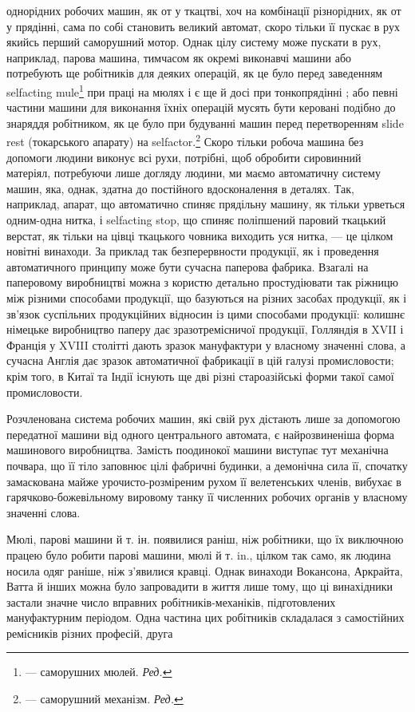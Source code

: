 \parcont{}  %
однорідних робочих машин, як от у ткацтві, хоч на комбінації
різнорідних, як от у прядінні, сама по собі становить великий
автомат, скоро тільки її пускає в рух якийсь перший саморушний
мотор. Однак цілу систему може пускати в рух, наприклад,
парова машина, тимчасом як окремі виконавчі машини або потребують
ще робітників для деяких операцій, як це було перед заведенням
selfacting mule\footnote*{
— саморушних мюлей. \emph{Ред.}
} при праці на мюлях і є ще й досі при тонкопрядінні
; або певні частини машини для виконання їхніх операцій
мусять бути керовані подібно до знаряддя робітником, як це було
при будуванні машин перед перетворенням slide rest (токарського
апарату) на selfactor.\footnote*{
— саморушний механізм. \emph{Ред.}
} Скоро тільки робоча машина без допомоги
людини виконує всі рухи, потрібні, щоб обробити сировинний
матеріял, потребуючи лише догляду людини, ми маємо автоматичну
систему машин, яка, однак, здатна до постійного вдосконалення
в деталях. Так, наприклад, апарат, що автоматично
спиняє прядільну машину, як тільки урветься одним-одна нитка,
і selfacting stop, що спиняє поліпшений паровий ткацький верстат,
як тільки на цівці ткацького човника виходить уся нитка, — це
цілком новітні винаходи. За приклад так безперервности продукції,
як і проведення автоматичного принципу може бути сучасна
паперова фабрика. Взагалі на паперовому виробництві можна з користю
детально простудіювати так ріжницю між різними способами
продукції, що базуються на різних засобах продукції, як
і зв’язок суспільних продукційних відносин із цими способами
продукції: колишнє німецьке виробництво паперу дає зразотремісничої
продукції, Голляндія в XVII і Франція у XVIII столітті
дають зразок мануфактури у власному значенні слова, а сучасна
Англія дає зразок автоматичної фабрикації в цій галузі промисловости;
крім того, в Китаї та Індії існують ще дві різні староазійські
форми такої самої промисловости.

Розчленована система робочих машин, які свій рух дістають лише
за допомогою передатної машини від одного центрального автомата,
є найрозвиненіша форма машинового виробництва. Замість
поодинокої машини виступає тут механічна почвара, що її тіло
заповнює цілі фабричні будинки, а демонічна сила її, спочатку
замаскована майже урочисто-розміреним рухом її велетенських
членів, вибухає в гарячково-божевільному вировому танку її
численних робочих органів у власному значенні слова.

Мюлі, парові машини й т. ін. появилися раніш, ніж робітники,
що їх виключною працею було робити парові машини, мюлі й
т. in., цілком так само, як людина носила одяг раніше, ніж з’явилися
кравці. Однак винаходи Вокансона, Аркрайта, Ватта
й інших можна було запровадити в життя лише тому, що ці винахідники
застали значне число вправних робітників-механіків,
підготовлених мануфактурним періодом. Одна частина цих робітників
складалася з самостійних ремісників різних професій, друга
\parbreak{}  %
